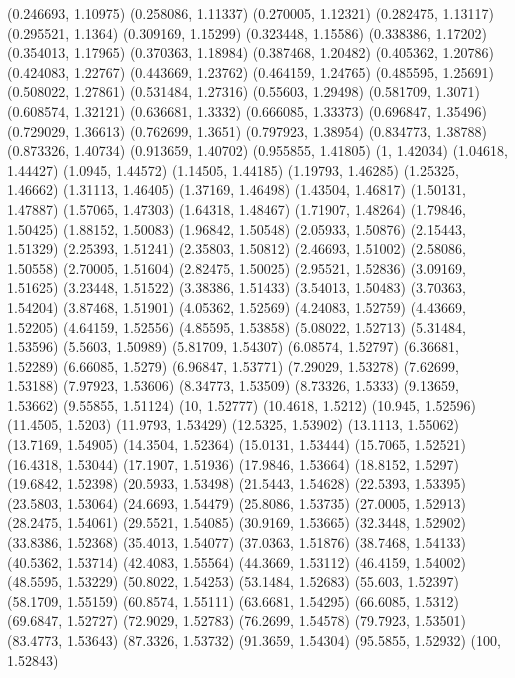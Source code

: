 {(0.246693, 1.10975)
(0.258086, 1.11337)
(0.270005, 1.12321)
(0.282475, 1.13117)
(0.295521, 1.1364)
(0.309169, 1.15299)
(0.323448, 1.15586)
(0.338386, 1.17202)
(0.354013, 1.17965)
(0.370363, 1.18984)
(0.387468, 1.20482)
(0.405362, 1.20786)
(0.424083, 1.22767)
(0.443669, 1.23762)
(0.464159, 1.24765)
(0.485595, 1.25691)
(0.508022, 1.27861)
(0.531484, 1.27316)
(0.55603, 1.29498)
(0.581709, 1.3071)
(0.608574, 1.32121)
(0.636681, 1.3332)
(0.666085, 1.33373)
(0.696847, 1.35496)
(0.729029, 1.36613)
(0.762699, 1.3651)
(0.797923, 1.38954)
(0.834773, 1.38788)
(0.873326, 1.40734)
(0.913659, 1.40702)
(0.955855, 1.41805)
(1, 1.42034)
(1.04618, 1.44427)
(1.0945, 1.44572)
(1.14505, 1.44185)
(1.19793, 1.46285)
(1.25325, 1.46662)
(1.31113, 1.46405)
(1.37169, 1.46498)
(1.43504, 1.46817)
(1.50131, 1.47887)
(1.57065, 1.47303)
(1.64318, 1.48467)
(1.71907, 1.48264)
(1.79846, 1.50425)
(1.88152, 1.50083)
(1.96842, 1.50548)
(2.05933, 1.50876)
(2.15443, 1.51329)
(2.25393, 1.51241)
(2.35803, 1.50812)
(2.46693, 1.51002)
(2.58086, 1.50558)
(2.70005, 1.51604)
(2.82475, 1.50025)
(2.95521, 1.52836)
(3.09169, 1.51625)
(3.23448, 1.51522)
(3.38386, 1.51433)
(3.54013, 1.50483)
(3.70363, 1.54204)
(3.87468, 1.51901)
(4.05362, 1.52569)
(4.24083, 1.52759)
(4.43669, 1.52205)
(4.64159, 1.52556)
(4.85595, 1.53858)
(5.08022, 1.52713)
(5.31484, 1.53596)
(5.5603, 1.50989)
(5.81709, 1.54307)
(6.08574, 1.52797)
(6.36681, 1.52289)
(6.66085, 1.5279)
(6.96847, 1.53771)
(7.29029, 1.53278)
(7.62699, 1.53188)
(7.97923, 1.53606)
(8.34773, 1.53509)
(8.73326, 1.5333)
(9.13659, 1.53662)
(9.55855, 1.51124)
(10, 1.52777)
(10.4618, 1.5212)
(10.945, 1.52596)
(11.4505, 1.5203)
(11.9793, 1.53429)
(12.5325, 1.53902)
(13.1113, 1.55062)
(13.7169, 1.54905)
(14.3504, 1.52364)
(15.0131, 1.53444)
(15.7065, 1.52521)
(16.4318, 1.53044)
(17.1907, 1.51936)
(17.9846, 1.53664)
(18.8152, 1.5297)
(19.6842, 1.52398)
(20.5933, 1.53498)
(21.5443, 1.54628)
(22.5393, 1.53395)
(23.5803, 1.53064)
(24.6693, 1.54479)
(25.8086, 1.53735)
(27.0005, 1.52913)
(28.2475, 1.54061)
(29.5521, 1.54085)
(30.9169, 1.53665)
(32.3448, 1.52902)
(33.8386, 1.52368)
(35.4013, 1.54077)
(37.0363, 1.51876)
(38.7468, 1.54133)
(40.5362, 1.53714)
(42.4083, 1.55564)
(44.3669, 1.53112)
(46.4159, 1.54002)
(48.5595, 1.53229)
(50.8022, 1.54253)
(53.1484, 1.52683)
(55.603, 1.52397)
(58.1709, 1.55159)
(60.8574, 1.55111)
(63.6681, 1.54295)
(66.6085, 1.5312)
(69.6847, 1.52727)
(72.9029, 1.52783)
(76.2699, 1.54578)
(79.7923, 1.53501)
(83.4773, 1.53643)
(87.3326, 1.53732)
(91.3659, 1.54304)
(95.5855, 1.52932)
(100, 1.52843)
}

